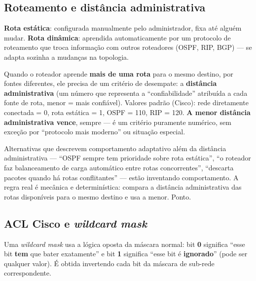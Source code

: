 \subsection{Roteamento e distância administrativa}

\begin{conceito}
\textbf{Rota estática}: configurada manualmente pelo administrador, fixa até
alguém mudar. \textbf{Rota dinâmica}: aprendida automaticamente por um
protocolo de roteamento que troca informação com outros roteadores (OSPF,
RIP, BGP) --- se adapta sozinha a mudanças na topologia.

Quando o roteador aprende \textbf{mais de uma rota} para o mesmo destino,
por fontes diferentes, ele precisa de um critério de desempate: a
\textbf{distância administrativa} (um número que representa a
“confiabilidade” atribuída a cada fonte de rota, menor = mais confiável).
Valores padrão (Cisco): rede diretamente conectada = 0, rota estática = 1,
OSPF = 110, RIP = 120. \textbf{A menor distância administrativa vence},
sempre --- é um critério puramente numérico, sem exceção por “protocolo
mais moderno” ou situação especial.
\end{conceito}

\begin{cuidado}
Alternativas que descrevem comportamento adaptativo além da distância
administrativa --- “OSPF sempre tem prioridade sobre rota estática”,
“o roteador faz balanceamento de carga automático entre rotas
concorrentes”, “descarta pacotes quando há rotas conflitantes” --- estão
inventando comportamento. A regra real é mecânica e determinística: compara
a distância administrativa das rotas disponíveis para o mesmo destino e
usa a menor. Ponto.
\end{cuidado}

\subsection{ACL Cisco e \textit{wildcard mask}}

\begin{conceito}
Uma \textit{wildcard mask} usa a lógica oposta da máscara normal: bit
\textbf{0} significa “esse bit \textbf{tem} que bater exatamente” e bit
\textbf{1} significa “esse bit é \textbf{ignorado}” (pode ser qualquer
valor). É obtida invertendo cada bit da máscara de sub-rede correspondente.
\end{conceito}

